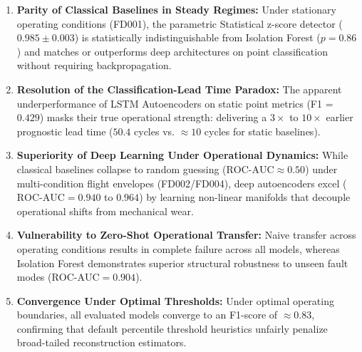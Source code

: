 \documentclass[12pt,a4paper,oneside]{report}
\begin{document}
\begin{enumerate}
    \item \textbf{Parity of Classical Baselines in Steady Regimes:} Under stationary operating conditions (FD001), the parametric Statistical z-score detector ($0.985 \pm 0.003$) is statistically indistinguishable from Isolation Forest ($p = 0.86$) and matches or outperforms deep architectures on point classification without requiring backpropagation.
    \item \textbf{Resolution of the Classification-Lead Time Paradox:} The apparent underperformance of LSTM Autoencoders on static point metrics (F1 = $0.429$) masks their true operational strength: delivering a $3\times$ to $10\times$ earlier prognostic lead time ($50.4$ cycles vs. $\approx 10$ cycles for static baselines).
    \item \textbf{Superiority of Deep Learning Under Operational Dynamics:} While classical baselines collapse to random guessing ($\text{ROC-AUC} \approx 0.50$) under multi-condition flight envelopes (FD002/FD004), deep autoencoders excel ($\text{ROC-AUC} = 0.940$ to $0.964$) by learning non-linear manifolds that decouple operational shifts from mechanical wear.
    \item \textbf{Vulnerability to Zero-Shot Operational Transfer:} Naive transfer across operating conditions results in complete failure across all models, whereas Isolation Forest demonstrates superior structural robustness to unseen fault modes ($\text{ROC-AUC} = 0.904$).
    \item \textbf{Convergence Under Optimal Thresholds:} Under optimal operating boundaries, all evaluated models converge to an F1-score of $\approx 0.83$, confirming that default percentile threshold heuristics unfairly penalize broad-tailed reconstruction estimators.
\end{enumerate}
\end{document}
